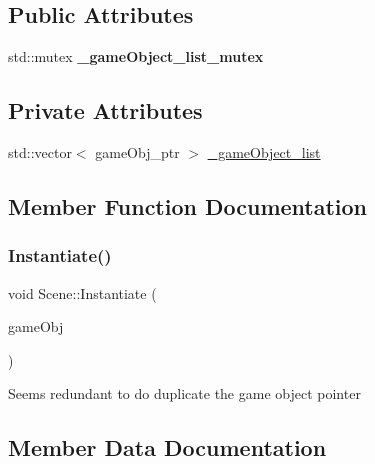 \subsection*{Public Attributes}
\begin{DoxyCompactItemize}
\item 
\mbox{\label{class_scene_a29183cf37f5227ea9a82d2a15c42336c}} 
std\+::mutex {\bfseries \+\_\+game\+Object\+\_\+list\+\_\+mutex}
\end{DoxyCompactItemize}
\subsection*{Private Attributes}
\begin{DoxyCompactItemize}
\item 
std\+::vector$<$ game\+Obj\+\_\+ptr $>$ \hyperlink{class_scene_af1956432917d14b0a0b26103dbcb5bcd}{\+\_\+game\+Object\+\_\+list}
\end{DoxyCompactItemize}


\subsection{Member Function Documentation}
\mbox{\label{class_scene_a3dd730cba4a22bf75e54c4b644c26976}} 
\subsubsection{\texorpdfstring{Instantiate()}{Instantiate()}}
{\footnotesize\ttfamily void Scene\+::\+Instantiate (\begin{DoxyParamCaption}\item[{shared\+\_\+ptr$<$ \hyperlink{class_game_object}{Game\+Object} $>$}]{game\+Obj }\end{DoxyParamCaption})}

Seems redundant to do duplicate the game object pointer 

\subsection{Member Data Documentation}
\mbox{\label{class_scene_af1956432917d14b0a0b26103dbcb5bcd}} 
